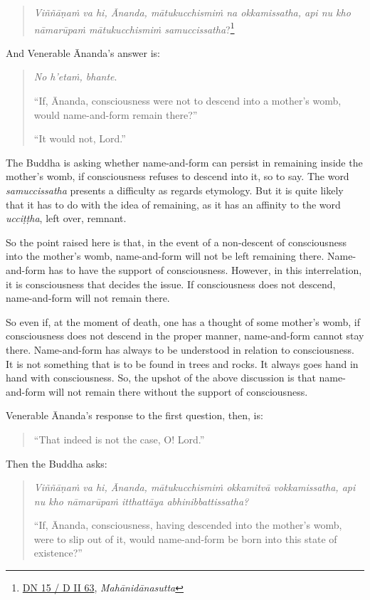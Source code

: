 \begin{quote}
\emph{Viññāṇaṁ va hi, Ānanda, mātukucchismiṁ na okkamissatha, api nu kho nāmarūpaṁ mātukucchismiṁ samuccissatha}?\footnote{\href{https://suttacentral.net/dn15/pli/ms}{DN 15 / D II 63}, \emph{Mahānidānasutta}}
\end{quote}

And Venerable Ānanda's answer is:

\begin{quote}
\emph{No h'etaṁ, bhante}.

``If, Ānanda, consciousness were not to descend into a mother's womb, would name-and-form remain there?''

``It would not, Lord.''
\end{quote}

The Buddha is asking whether name-and-form can persist in remaining inside the mother's womb, if consciousness refuses to descend into it, so to say. The word \emph{samuccissatha} presents a difficulty as regards etymology. But it is quite likely that it has to do with the idea of remaining, as it has an affinity to the word \emph{ucciṭṭha}, left over, remnant.

So the point raised here is that, in the event of a non-descent of consciousness into the mother's womb, name-and-form will not be left remaining there. Name-and-form has to have the support of consciousness. However, in this interrelation, it is consciousness that decides the issue. If consciousness does not descend, name-and-form will not remain there.

So even if, at the moment of death, one has a thought of some mother's womb, if consciousness does not descend in the proper manner, name-and-form cannot stay there. Name-and-form has always to be understood in relation to consciousness. It is not something that is to be found in trees and rocks. It always goes hand in hand with consciousness. So, the upshot of the above discussion is that name-and-form will not remain there without the support of consciousness.

Venerable Ānanda's response to the first question, then, is:

\begin{quote}
``That indeed is not the case, O! Lord.''
\end{quote}

Then the Buddha asks:

\begin{quote}
\emph{Viññāṇaṁ va hi, Ānanda, mātukucchismiṁ okkamitvā vokkamissatha, api nu kho nāmarūpaṁ itthattāya abhinibbattissatha?}

``If, Ānanda, consciousness, having descended into the mother's womb, were to slip out of it, would name-and-form be born into this state of existence?''
\end{quote}

